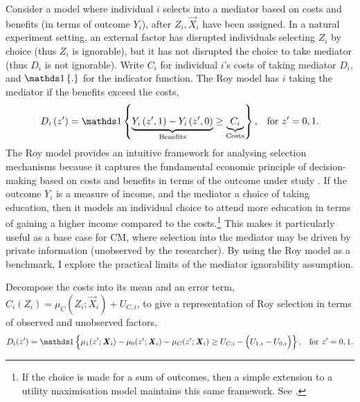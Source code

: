 Consider a model where individual $i$ selects into a mediator based on costs and benefits (in terms of outcome $Y_i$), after $Z_i, \vec X_i$ have been assigned.
In a natural experiment setting, an external factor has disrupted individuals selecting $Z_i$ by choice (thus $Z_i$ is ignorable), but it has not disrupted the choice to take mediator (thus $D_i$ is not ignorable).
Write $C_i$ for individual $i$'s costs of taking mediator $D_i$, and $\indicator{.}$ for the indicator function.
The Roy model has $i$ taking the mediator if the benefits exceed the costs,
\begin{equation}
    \label{eqn:roy-model}
    D_i \left( z' \right) = \indicator{
    \underbrace{Y_i\left( z', 1 \right) - Y_i\left( z', 0 \right)}_{\text{Benefits}}
    \geq \underbrace{C_i}_{\text{Costs}}}, \;\;\; \text{for } z'=0,1.
\end{equation}
The Roy model provides an intuitive framework for analysing selection mechanisms because it captures the fundamental economic principle of decision-making based on costs and benefits in terms of the outcome under study \citep{roy1951some,heckman1990empirical}.
If the outcome $Y_i$ is a measure of income, and the mediator a choice of taking education, then it models an individual choice to attend more education in terms of gaining a higher income compared to the costs.\footnote{
    If the choice is made for a sum of outcomes, then a simple extension to a utility maximisation model maintains this same framework.
    See \cite{heckman1990empirical,eisenhauer2015generalized}.
}
This makes it particularly useful as a base case for CM, where selection into the mediator may be driven by private information (unobserved by the researcher).
By using the Roy model as a benchmark, I explore the practical limits of the mediator ignorability assumption.

Decompose the costs into its mean and an error term, $C_i(Z_i) = \mu_{C}(Z_i; \vec X_i) + U_{C,i}$, to give a representation of Roy selection in terms of observed and unobserved factors,
\[ D_i(z') = \indicator{
    \mu_1(z'; \vec X_i) - \mu_0(z'; \vec X_i) - \mu_C(z'; \vec X_i)
    \geq U_{C,i} - \Big(U_{1,i} - U_{0,i}\Big) }
        , \;\;\; \text{for } z'=0,1. \]

